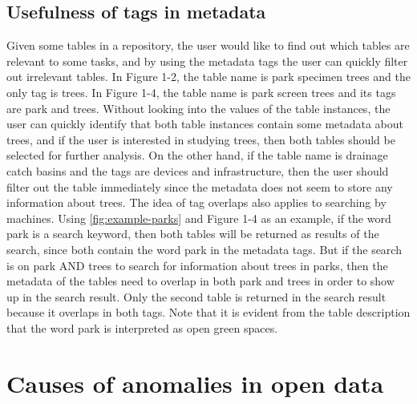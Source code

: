 \subsection{Usefulness of tags in metadata}
Given some tables in a repository, the user would like to find out which tables are relevant to some tasks, and by using the metadata tags the user can quickly filter out irrelevant tables. In Figure 1-2, the table name is park specimen trees and the only tag is trees. In Figure 1-4, the table name is park screen trees and its tags are park and trees. Without looking into the values of the table instances, the user can quickly identify that both table instances contain some metadata about trees, and if the user is interested in studying trees, then both tables should be selected for further analysis. On the other hand, if the table name is drainage catch basins and the tags are devices and infrastructure, then the user should filter out the table immediately since the metadata does not seem to store any information about trees.
The idea of tag overlaps also applies to searching by machines. Using \autoref{fig:example-parks} and Figure 1-4 as an example, if the word park is a search keyword, then both tables will be returned as results of the search, since both contain the word park in the metadata tags. But if the search is on park AND trees to search for information about trees in parks, then the metadata of the tables need to overlap in both park and trees in order to show up in the search result. Only the second table is returned in the search result because it overlaps in both tags. Note that it is evident from the table description that the word park is interpreted as open green spaces.

\section{Causes of anomalies in open data}
\label{sec:CausesOfAnomaliesInOpenData}

